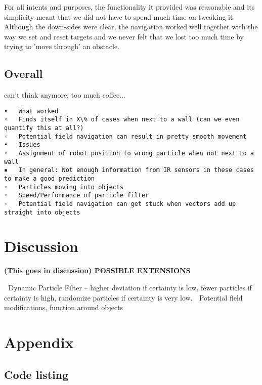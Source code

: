 \documentclass[paper=a4, fontsize=12pt]{scrartcl}	%
\numberwithin{equation}{section}		%
\numberwithin{figure}{section}			%
\numberwithin{table}{section}				%
\begin{document}
For all intents and purposes, the functionality it provided was reasonable and its simplicity meant that we did not have to spend much time on tweaking it. Although the down-sides were clear, the navigation worked well together with the way we set and reset targets and we never felt that we lost too much time by trying to 'move through' an obstacle.

\subsection{Overall}
can't think anymore, too much coffee...

\begin{verbatim}
•	What worked
◦	Finds itself in X\% of cases when next to a wall (can we even quantify this at all?)
◦	Potential field navigation can result in pretty smooth movement
•	Issues
◦	Assignment of robot position to wrong particle when not next to a wall
▪	In general: Not enough information from IR sensors in these cases to make a good prediction
◦	Particles moving into objects
◦	Speed/Performance of particle filter
◦	Potential field navigation can get stuck when vectors add up straight into objects
\end{verbatim}

\section{Discussion}
\textbf{(This goes in discussion) POSSIBLE EXTENSIONS}

	Dynamic Particle Filter – higher deviation if certainty is low, fewer particles if certainty is high, randomize particles if certainty is very low.
	Potential field modifications, function around objects
\section{Appendix}
\subsection{Code listing}

\end{document}
